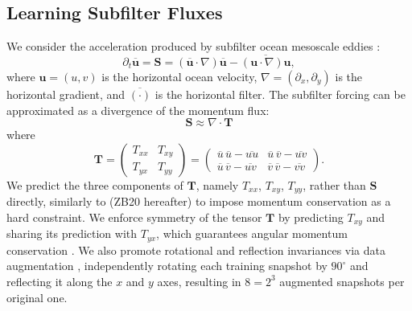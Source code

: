 \documentclass[draft]{agujournal2019}
\begin{document}
\subsection{Learning Subfilter Fluxes}
We consider the acceleration produced by subfilter ocean mesoscale eddies \cite<subfilter forcing,>{Bolton2019}:
\begin{equation}
    \partial_t \overline{\mathbf{u}} = \mathbf{S} = (\overline{\mathbf{u}} \cdot \nabla ) \overline{\mathbf{u}} - \overline{(\mathbf{u} \cdot \nabla) \mathbf{u}},  \label{eq:subfilter_forcing}
\end{equation}
where $\mathbf{u}=(u,v)$ is the horizontal ocean  velocity, $\nabla=(\partial_x, \partial_y)$ is the horizontal gradient, and $\overline{(\cdot)}$ is the horizontal filter. The subfilter forcing can be approximated \cite{loose2023comparing} as a divergence of the momentum flux:
\begin{equation}
    \mathbf{S} \approx \nabla \cdot \mathbf{T} \label{eq:momentum_div}
\end{equation}
where
\begin{equation}
    \mathbf{T} = \begin{pmatrix}
        T_{xx} & T_{xy} \\
        T_{yx} & T_{yy}
    \end{pmatrix} = \begin{pmatrix}
        \overline{u}  \, \overline{u} - \overline{u u} & \overline{u} \, \overline{v} - \overline{uv} \\
        \overline{u} \, \overline{v} - \overline{uv} & 
        \overline{v}  \, \overline{v} - \overline{v v}
    \end{pmatrix}. \label{eq:momentum_flux}
\end{equation}
We predict the three components of $ \mathbf{T}$, namely   $T_{xx}$, $T_{xy}$, $T_{yy}$, rather than $\mathbf{S}$ directly, similarly to  (ZB20 hereafter) to impose momentum conservation as a hard constraint. We enforce symmetry of the tensor $\mathbf{T}$ by predicting $T_{xy}$ and sharing its prediction with $T_{yx}$, which guarantees angular momentum conservation \cite[Section 17.3.3]{griffies2018fundamentals}. We also promote rotational and reflection invariances via data augmentation \cite{guan2022learning}, independently rotating each training snapshot by $90^\circ$ and reflecting it along the $x$ and $y$ axes, resulting in $8=2^3$ augmented snapshots per original one.
\end{document}
